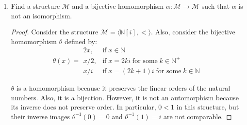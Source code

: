 \documentclass{article}
\begin{document}
\begin{enumerate}
  \item Find a structure $\mathcal{M}$ and a bijective homomorphism
    $\alpha:\mathcal{M}\rightarrow\mathcal{M}$ such that $\alpha$ is not an
    isomorphism.

    \begin{proof}
      Consider the structure $\mathcal{M}=\langle\mathbb{N}[i],<\rangle$.
      Also, consider the bijective homomorphism $\theta$ defined by:
      \begin{equation*}
        \theta(x) =
          \begin{array}{ll}
            2x,   & \text{if}\; x\in\mathbb{N} \\
            x/2,  & \text{if}\; x=2ki\; \text{for some}\; k\in\mathbb{N}^+ \\
            x/i   & \text{if}\; x=(2k+1)i\; \text{for some}\; k\in\mathbb{N}
          \end{array}
      \end{equation*}

      $\theta$ is a homomorphism because it preserves the linear orders of
      the natural numbers. Also, it is a bijection. However, it is not an
      automorphism because its inverse does not preserve order. In
      particular, $0<1$ in this structure, but their inverse images
      $\theta^{-1}(0)=0$ and $\theta^{-1}(1)=i$ are not comparable.
    \end{proof}
\end{enumerate}
\end{document}
